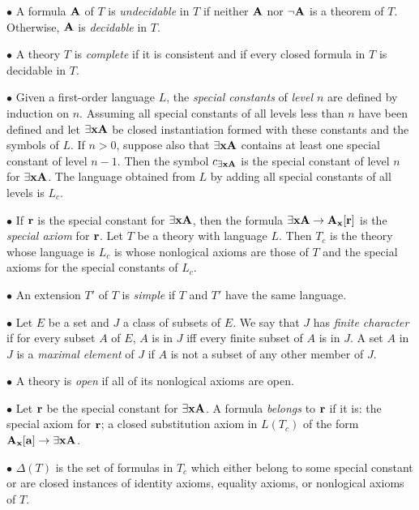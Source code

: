\item{$\bullet$} A formula ${\bf A}$ of $T$ is {\it undecidable} in $T$ if neither ${\bf A}$
nor $\neg{\bf A}$ is a theorem of $T$. Otherwise, ${\bf A}$ is {\it decidable} in $T$.

\item{$\bullet$} A theory $T$ is {\it complete} if it is consistent and if every
closed formula in $T$ is decidable in $T$.

\item{$\bullet$} Given a first-order language $L$, the {\it special constants} of
{\it level $n$} are defined by induction on $n$. Assuming all special constants of
all levels less than $n$ have been defined and let $\exists{\bf x}{\bf A}$ be closed instantiation
formed with these constants and the symbols of $L$. If $n > 0$, suppose also that
$\exists{\bf x}{\bf A}$ contains at least one special constant of level $n-1$. Then the symbol
$c_{\exists{\bf x}{\bf A}}$ is the special constant of level $n$ for $\exists{\bf x}{\bf A}$. The language
obtained from $L$ by adding all special constants of all levels is $L_c$.

\item{$\bullet$} If ${\bf r}$ is the special constant for $\exists{\bf x}{\bf A}$, then the formula
$\exists{\bf x}{\bf A} \to {\bf A}_{\bf x}[{\bf r}]$ is the {\it special axiom} for ${\bf r}$. Let $T$ be a theory
with language $L$. Then $T_c$ is the theory whose language is $L_c$ is whose
nonlogical axioms are those of $T$ and the special axioms for the special constants
of $L_c$.

\item{$\bullet$} An extension $T'$ of $T$ is {\it simple} if $T$ and $T'$ have 
the same language.

\item{$\bullet$} Let $E$ be a set and $J$ a class of subsets of $E$. We say that $J$
has {\it finite character} if for every subset $A$ of $E$, $A$ is in $J$ iff every
finite subset of $A$ is in $J$. A set $A$ in $J$ is a {\it maximal element} of $J$
if $A$ is not a subset of any other member of $J$.

\item{$\bullet$} A theory is {\it open} if all of its nonlogical axioms are open.

\item{$\bullet$} Let ${\bf r}$ be the special constant for $\exists{\bf x}{\bf A}$. A formula 
{\it belongs} to ${\bf r}$ if it is:
\itemitem{-} the special axiom for ${\bf r}$;
\itemitem{-} a closed substitution axiom in $L(T_c)$ of the form ${\bf A}_{\bf x}[{\bf a}] \to \exists{\bf x}{\bf A}$.

\item{$\bullet$} $\Delta(T)$ is the set of formulas in $T_c$ which either belong to
some special constant or are closed instances of identity axioms, equality axioms,
or nonlogical axioms of $T$.


